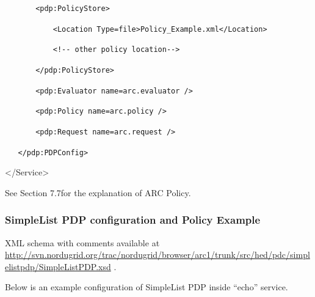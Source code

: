 \documentclass{article}
\newcommand\textstyleInternetlink[1]{\textcolor[rgb]{0.0,0.0,0.5019608}{#1}}
\begin{document}
{\upshape\color{black}
\texttt{\ \ \ \ \ \ \ {\textless}pdp:PolicyStore{\textgreater}}}

{\upshape\color{black}
\texttt{\ \ \ \ \ \ \ \ \ \ \ {\textless}Location
Type={\textquotedbl}file{\textquotedbl}{\textgreater}Policy\_Example.xml{\textless}/Location{\textgreater}}}

{\upshape\color{black}
\texttt{\ \ \ \ \ \ \ \ \ \ \ {\textless}!-{}- other policy
location-{}-{\textgreater}}}

{\upshape\color{black}
\texttt{\ \ \ \ \ \ \ {\textless}/pdp:PolicyStore{\textgreater}}}

{\upshape\color{black}
\texttt{\ \ \ \ \ \ \ {\textless}pdp:Evaluator
name={\textquotedbl}arc.evaluator{\textquotedbl} /{\textgreater}}}

{\upshape\color{black}
\texttt{\ \ \ \ \ \ \ {\textless}pdp:Policy
name={\textquotedbl}arc.policy{\textquotedbl} /{\textgreater}}}

{\upshape\color{black}
\texttt{\ \ \ \ \ \ \ {\textless}pdp:Request
name={\textquotedbl}arc.request{\textquotedbl} /{\textgreater}}}

{\upshape\color{black}
\texttt{\ \ \ {\textless}/pdp:PDPConfig{\textgreater}}}

{\ttfamily\color{black}
{\textless}/Service{\textgreater}}

{\upshape\color{black}
See Section 7.7for the explanation of ARC Policy.}

\subsubsection{SimpleList PDP configuration and Policy Example}
{\upshape\color{black}
XML schema with comments available at
\href{http://svn.nordugrid.org/trac/nordugrid/browser/arc1/trunk/src/hed/pdc/simplelistpdp/SimpleListPDP.xsd}{\textstyleInternetlink{http://svn.nordugrid.org/trac/nordugrid/browser/arc1/trunk/src/hed/pdc/simplelistpdp/SimpleListPDP.}}\href{http://svn.nordugrid.org/trac/nordugrid/browser/arc1/trunk/src/hed/pdc/simplelistpdp/SimpleListPDP.xsd}{\textstyleInternetlink{xsd}}
.}

{\upshape\color{black}
Below is an example configuration of SimpleList PDP inside
{\textquotedblleft}echo{\textquotedblright} service.}
\end{document}
